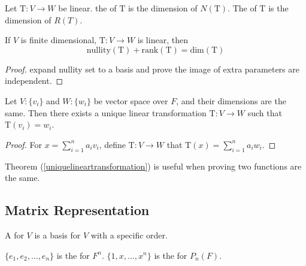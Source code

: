 \begin{definition}
	Let $\mathrm{T}: V \rightarrow W$ be linear. the   of $\mathrm{T}$ is the dimension of $N(\mathrm{T})$. The  \label{rankdefinition} of $\mathrm{T}$ is the dimension of $R(T)$.
\end{definition}

\begin{theorem}
	If $V$ is finite dimensional, $\mathrm{T}:V\rightarrow W$ is linear, then
	\begin{equation}
		\text{nullity}(\mathrm{T})  + \text{rank}(\mathrm{T}) = \text{dim}(\mathrm{T})
	\end{equation}
\end{theorem}

\begin{proof}
	expand nullity set to a basis and prove the image of extra parameters are independent.
\end{proof}

\begin{theorem}\label{uniquelineartransformation}
	Let $V:\{v_i \}$ and $W:\{w_i \}$ be vector space over $F$, and their dimensions are the same. Then there exists a unique linear transformation $\mathrm{T}:V\rightarrow W$ such that $\mathrm{T}(v_i) = w_i$.
\end{theorem}

\begin{proof}
    For $x = \sum_{i=1}^{n} a_i v_i$, define $\mathrm{T}:V \rightarrow W$ that $\mathrm{T}(x) = \sum_{i=1}^n a_i w_i$.
\end{proof}

Theorem (\ref{uniquelineartransformation}) is useful when proving two functions are the same.

\subsection{Matrix Representation}

\begin{definition}
	A   for $V$ is a basis for $V$ with a specific order.
\end{definition}

\begin{definition}
	$\{e_1, e_2, \dots, e_n \}$ is the   for $F^n$. $\{1, x, \dots, x^n \}$ is the   for $P_n (F)$.
\end{definition}

